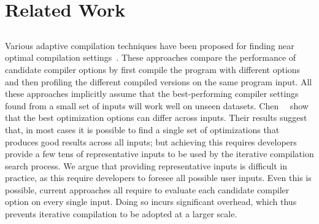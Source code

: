 \section{Related Work}\label{sec:relatedwork}

\subsection{{\IterComp}}
Various adaptive compilation techniques have been proposed for finding near optimal compilation
settings~\cite{agakov06,kulkarni04,stephenson03,hoste08}. These approaches compare the performance of candidate compiler options by first
compile the program with different options and then profiling the different compiled versions on the same program input. All these
approaches implicitly assume that the best-performing compiler settings found from a small set of inputs will work well on unseen datasets.
Chen~\etal~\cite{chen10,chen12a} show that the best optimization options can differ across inputs. Their results suggest that, in most
cases it is possible to find a single set of optimizations that produces good results across all inputs; but achieving this requires
developers provide a few tens of representative inputs to be used by the iterative compilation search process. We argue that providing
representative inputs is difficult in practice, as this require developers to foresee all possible user inputs. Even this is possible,
current approaches all require to evaluate each candidate compiler option on every single input. Doing so incurs significant overhead,
which thus prevents iterative compilation to be adopted at a larger scale.


